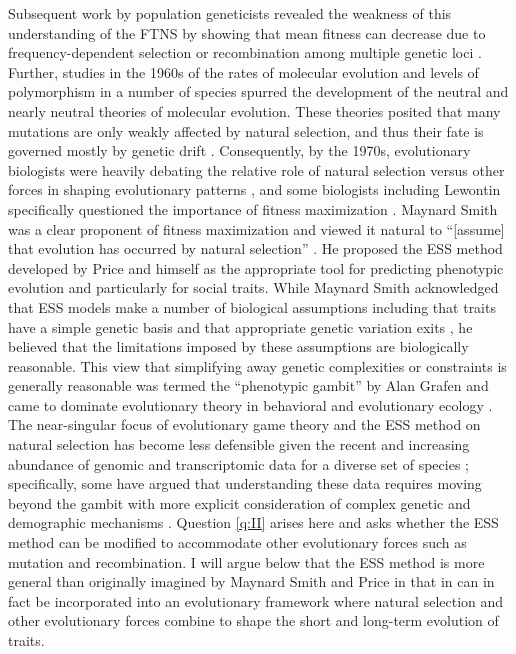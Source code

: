 \documentclass[11pt]{article}
\begin{document}
Subsequent work by population geneticists revealed the weakness of this understanding of the FTNS by showing that mean fitness can decrease due to frequency-dependent selection \cite{Wright:1955,Lewontin:1970} or recombination among multiple genetic loci \cite{Kojima:Kelleher:1961,Moran:1964,Karlin:1975,Akin:1979}. Further, studies in the 1960s of the rates of molecular evolution \cite{Zuckerkandl:Pauling:1965,King:Jukes:1969} and levels of polymorphism \cite{Harris:1966,Lewontin:Hubby:1966} in a number of species spurred the development of the neutral \cite{Kimura:1968,Kimura:1983:book} and nearly neutral \cite{Ohta:1974,Ohta:1992} theories \cite{Ohta:Gillespie:1996} of molecular evolution. These theories posited that many mutations are only weakly affected by natural selection, and thus their fate is governed mostly by genetic drift \cite{Kimura:1983:book}. Consequently, by the 1970s, evolutionary biologists were heavily debating the relative role of natural selection versus other forces in shaping evolutionary patterns \cite{Gillespie:Langley:1974,Gillespie:1978}, and some biologists including Lewontin specifically questioned the importance of fitness maximization \cite{Karlin:1975,Gould:Lewontin:1979}. Maynard Smith was a clear proponent of fitness maximization and viewed it natural to ``[assume] that evolution has occurred by natural selection'' \cite[p. 31]{MaynardSmith:1978}. He proposed the ESS method developed by Price and himself as the appropriate tool for predicting phenotypic evolution and particularly for social traits. While Maynard Smith acknowledged that ESS models make a number of biological assumptions including that traits have a simple genetic basis and that appropriate genetic variation exits \cite{MaynardSmith:1978}, he believed that the limitations imposed by these assumptions are biologically reasonable. This view that simplifying away genetic complexities or constraints is generally reasonable was termed the ``phenotypic gambit'' by Alan Grafen \cite{Grafen:1984} and came to dominate evolutionary theory in behavioral and evolutionary ecology \cite{Houston:McNamara:1999}. The near-singular focus of evolutionary game theory and the ESS method on natural selection has become less defensible given the recent and increasing abundance of genomic and transcriptomic data for a diverse set of species \cite[e.g.,][]{Kapheim:Pan:2015,Mikheyev:Linksvayer:2015,Warner:Mikheyev:2017,Kocher:Mallarino:2018,Warner:Mikheyev:2019}; specifically, some have argued that understanding these data requires moving beyond the gambit with more explicit consideration of complex genetic and demographic mechanisms \cite[e.g.,][]{Springer:Crespi:2011,Rittschof:Robinson:2014,Akcay:Linksvayer:2015,Cunningham:2020}. Question \ref{q:II} arises here and asks whether the ESS method can be modified to accommodate other evolutionary forces such as mutation and recombination. I will argue below that the ESS method is more general than originally imagined by Maynard Smith and Price \cite{Maynard-Smith:Price:1973} in that in can in fact be incorporated into an evolutionary framework where natural selection and other evolutionary forces combine to shape the short and long-term evolution of traits.
\end{document}

